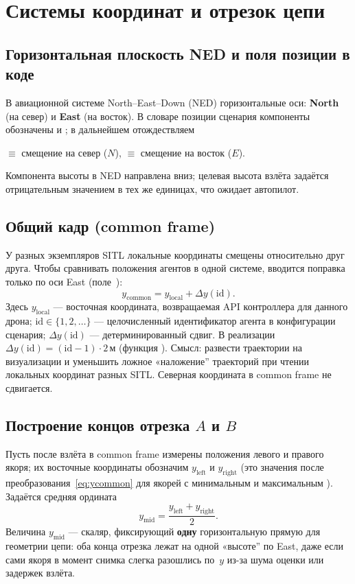 \documentclass[a4paper,11pt]{article}
\newcommand{\code}[1]{\texttt{\detokenize{#1}}}
\begin{document}
\section{Системы координат и отрезок цепи}
\label{sec:coords}

\subsection{Горизонтальная плоскость NED и поля позиции в коде}
В авиационной системе North--East--Down (NED) горизонтальные оси: \textbf{North} (на север) и \textbf{East} (на восток). В словаре позиции сценария компоненты обозначены \code{x} и \code{y}; в дальнейшем отождествляем
\begin{center}
\code{x} $\equiv$ смещение на север ($N$),\quad \code{y} $\equiv$ смещение на восток ($E$).
\end{center}
Компонента высоты \code{z} в NED направлена вниз; целевая высота взлёта задаётся отрицательным значением \code{-TAKEOFF\_ALT\_M} в тех же единицах, что ожидает автопилот.

\subsection{Общий кадр (common frame)}
У разных экземпляров SITL локальные координаты смещены относительно друг друга. Чтобы сравнивать положения агентов в одной системе, вводится поправка только по оси East (поле~\code{y}):
\begin{equation}
\label{eq:ycommon}
y_{\mathrm{common}} = y_{\mathrm{local}} + \Delta y(\mathrm{id}).
\end{equation}
Здесь $y_{\mathrm{local}}$ --- восточная координата, возвращаемая API контроллера для данного дрона; $\mathrm{id}\in\{1,2,\ldots\}$ --- целочисленный идентификатор агента в конфигурации сценария; $\Delta y(\mathrm{id})$ --- детерминированный сдвиг. В реализации $\Delta y(\mathrm{id}) = (\mathrm{id}-1)\cdot 2$\,м (функция \code{\_did\_offset\_y}). Смысл: развести траектории на визуализации и уменьшить ложное «наложение'' траекторий при чтении локальных координат разных SITL. Северная координата \code{x} в common frame не сдвигается.

\subsection{Построение концов отрезка $A$ и $B$}
\label{sec:segment}
Пусть после взлёта в common frame измерены положения левого и правого якоря; их восточные координаты обозначим $y_{\mathrm{left}}$ и $y_{\mathrm{right}}$ (это значения \code{y} после преобразования~\eqref{eq:ycommon} для якорей с минимальным и максимальным \code{id}). Задаётся средняя ордината
\begin{equation}
\label{eq:ymid}
y_{\mathrm{mid}} = \frac{y_{\mathrm{left}} + y_{\mathrm{right}}}{2}.
\end{equation}
Величина $y_{\mathrm{mid}}$ --- скаляр, фиксирующий \textbf{одну} горизонтальную прямую для геометрии цепи: оба конца отрезка лежат на одной «высоте'' по East, даже если сами якоря в момент снимка слегка разошлись по~$y$ из-за шума оценки или задержек взлёта.
\end{document}
